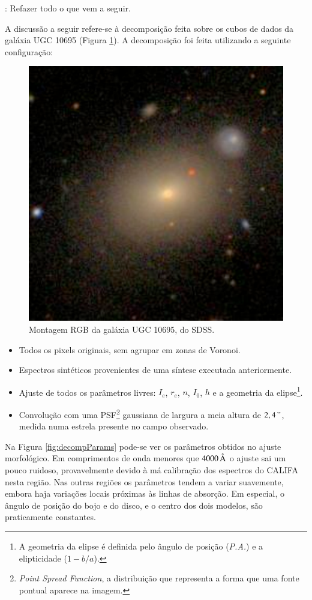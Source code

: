 \TODO: Refazer todo o que vem a seguir.

A discussão a seguir refere-se à decomposição feita sobre os cubos de dados da
galáxia UGC 10695 (Figura \ref{fig:decompTarget}). A decomposição foi feita
utilizando a seguinte configuração:

\begin{figure}
	\includegraphics[width=0.3\columnwidth]{figuras/K0846}
	\caption[Montagem RGB da galáxia UGC 10695, do SDSS] {Montagem RGB da galáxia 
	UGC 10695, do SDSS.}
	\label{fig:decompTarget}
\end{figure}

\begin{itemize}

	\item Todos os pixels originais, sem agrupar em zonas de Voronoi.

	\item Espectros sintéticos provenientes de uma síntese executada anteriormente.

	\item Ajuste de todos os parâmetros livres: $I_e$, $r_e$, $n$, $I_0$, $h$ e a
	geometria da elipse\footnote{A geometria da elipse é definida pelo ângulo de
	posição ({\em P.A.}) e a elipticidade ($1 - b/a$).}.

	\item Convolução com uma PSF\footnote{{\em Point Spread Function}, a
	distribuição que representa a forma que uma fonte pontual aparece na imagem.}
	gaussiana de largura a meia altura de $2,4\,"$, medida numa estrela presente no
	campo observado.

\end{itemize}

Na Figura \ref{fig:decompParams} pode-se ver os parâmetros obtidos no ajuste
morfológico. Em comprimentos de onda menores que $4000\,\text{\normalfont\AA}$ o ajuste sai
um pouco ruidoso, provavelmente devido à má calibração dos espectros do CALIFA
nesta região. Nas outras regiões os parâmetros tendem a variar suavemente,
embora haja variações locais próximas às linhas de absorção. Em especial, o
ângulo de posição do bojo e do disco, e o centro dos dois modelos, são
praticamente constantes.

